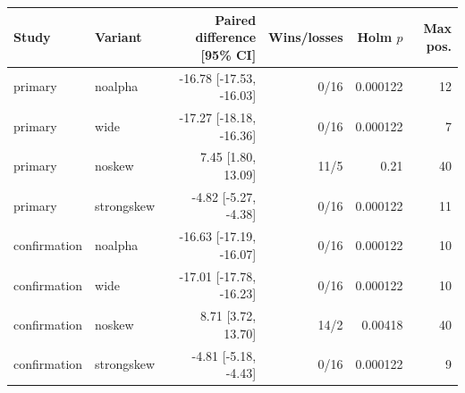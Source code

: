 \begin{tabular}{llrrrr}
\hline
Study & Variant & Paired difference [95\% CI] & Wins/losses & Holm $p$ & Max pos.\\
\hline
primary & noalpha & -16.78 [-17.53, -16.03] & 0/16 & 0.000122 & 12\\
primary & wide & -17.27 [-18.18, -16.36] & 0/16 & 0.000122 & 7\\
primary & noskew & 7.45 [1.80, 13.09] & 11/5 & 0.21 & 40\\
primary & strongskew & -4.82 [-5.27, -4.38] & 0/16 & 0.000122 & 11\\
confirmation & noalpha & -16.63 [-17.19, -16.07] & 0/16 & 0.000122 & 10\\
confirmation & wide & -17.01 [-17.78, -16.23] & 0/16 & 0.000122 & 10\\
confirmation & noskew & 8.71 [3.72, 13.70] & 14/2 & 0.00418 & 40\\
confirmation & strongskew & -4.81 [-5.18, -4.43] & 0/16 & 0.000122 & 9\\
\hline
\end{tabular}